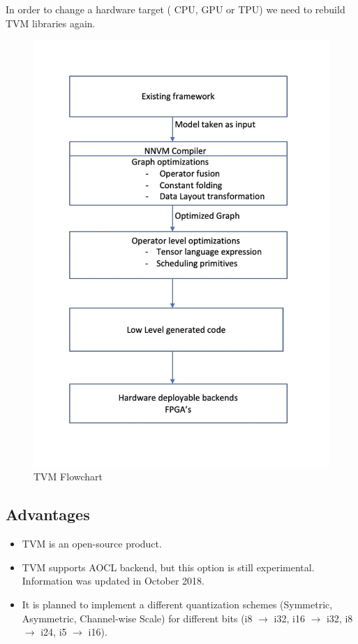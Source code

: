 \documentclass[titlepage]{report}
\begin{document}
In order to change a hardware target ( CPU, GPU or TPU) we need to rebuild TVM libraries again.  

\begin{figure}[h!]
    \centering
    \includegraphics[scale=0.30]{TVM.png}
    \caption{TVM Flowchart}
\end{figure}
 
 \subsection{Advantages}
 \begin{itemize}
 \item TVM is an open-source product.
 \item TVM supports AOCL backend, but this option is still experimental. Information was updated in October 2018.
  \item It is planned to implement a different quantization schemes (Symmetric, Asymmetric, Channel-wise Scale) for different bits (i8 $\to$ i32, i16 $\to$ i32, i8 $\to$ i24, i5 $\to$ i16).
 \end{itemize}
\end{document}
